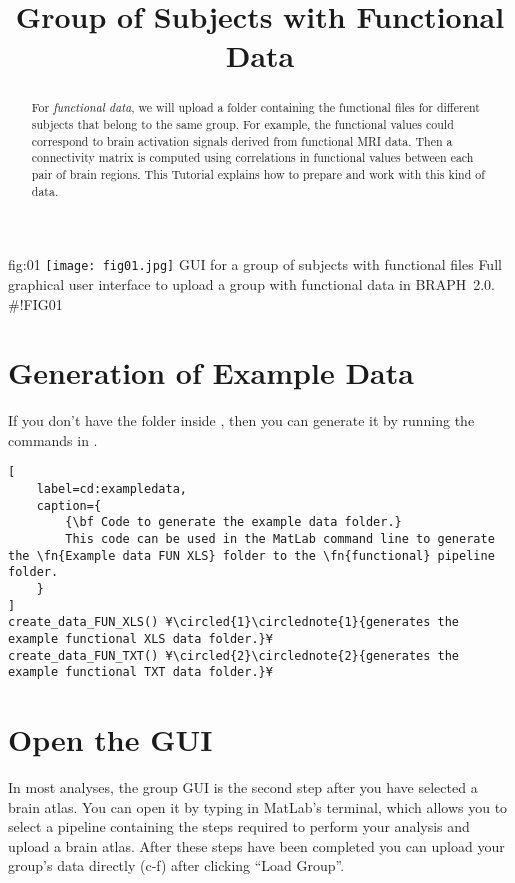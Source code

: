\documentclass[justified]{tufte-handout}
\title{Group of Subjects with Functional Data}
\begin{document}
\maketitle

\begin{abstract}
\noindent
For \emph{functional data}, we will upload a folder containing the functional files for different subjects that belong to the same group. For example, the functional values could correspond to brain activation signals derived from functional MRI data. Then a connectivity matrix is computed using correlations in functional values between each pair of brain regions. This Tutorial explains how to prepare and work with this kind of data.
\end{abstract}

\tableofcontents

	{fig:01}
	{\texttt{[image: fig01.jpg]}}
	{GUI for a group of subjects with functional files}
	{
	Full graphical user interface to upload a group with functional data in BRAPH~2.0. 
	}
#!FIG01

\clearpage
\section{Generation of Example Data}

If you don't have the  folder inside , then you can generate it by running the commands in .

\begin{lstlisting}[
	label=cd:exampledata,
	caption={
		{\bf Code to generate the example data folder.}
		This code can be used in the MatLab command line to generate the \fn{Example data FUN XLS} folder to the \fn{functional} pipeline folder.
	}
]
create_data_FUN_XLS() ¥\circled{1}\circlednote{1}{generates the example functional XLS data folder.}¥
create_data_FUN_TXT() ¥\circled{2}\circlednote{2}{generates the example functional TXT data folder.}¥
\end{lstlisting}

\section{Open the GUI}

In most analyses, the group GUI is the second step after you have selected a brain atlas. You can open it by typing  in MatLab's terminal, which allows you to select a pipeline containing the steps required to perform your analysis and upload a brain atlas. After these steps have been completed you can upload your group's data directly (c-f) after clicking ``Load Group''. 
\end{document}
